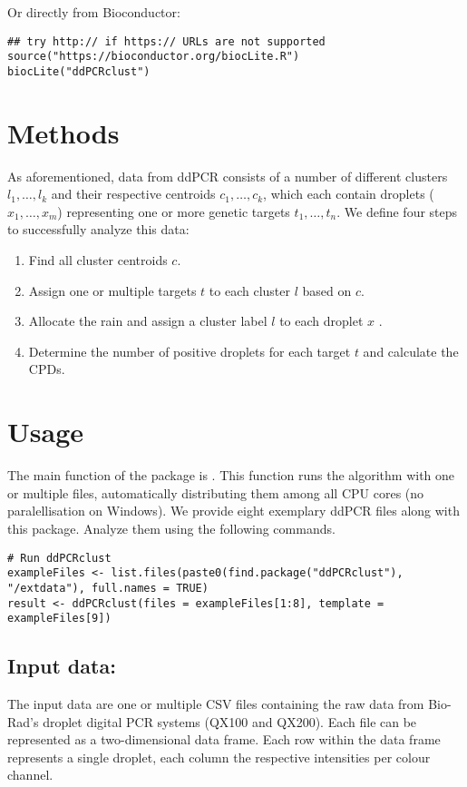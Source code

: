 \documentclass{article}
\begin{document}
Or directly from Bioconductor:

\begin{verbatim}
## try http:// if https:// URLs are not supported
source("https://bioconductor.org/biocLite.R")
biocLite("ddPCRclust")
\end{verbatim}

\section{Methods}
As aforementioned, data from ddPCR consists of a number of different clusters $l_1, \dots, l_k$ and their respective centroids $c_1, \dots, c_k$, which each contain droplets ($x_1, \dots, x_m$) representing one or more genetic targets $t_1, \dots, t_n$. We define four steps to successfully analyze this data:

\begin{enumerate}
\item Find all cluster centroids $c$.
\item Assign one or multiple targets $t$ to each cluster $l$ based on $c$.
\item Allocate the rain and assign a cluster label $l$ to each droplet $x$ .
\item Determine the number of positive droplets for each target $t$ and calculate the CPDs.
\end{enumerate}

\section{Usage}
The main function of the package is . This function runs the algorithm with one or multiple files, automatically distributing them among all CPU cores (no paralellisation on Windows). We provide eight exemplary ddPCR files along with this package. Analyze them using the following commands.

\begin{verbatim}
# Run ddPCRclust
exampleFiles <- list.files(paste0(find.package("ddPCRclust"), "/extdata"), full.names = TRUE)
result <- ddPCRclust(files = exampleFiles[1:8], template = exampleFiles[9])
\end{verbatim}

\subsection{Input data:}
The input data are one or multiple CSV files containing the raw data from Bio-Rad's droplet digital PCR systems (QX100 and QX200). Each file can be represented as a two-dimensional data frame. Each row within the data frame represents a single droplet, each column the respective intensities per colour channel.
\end{document}
